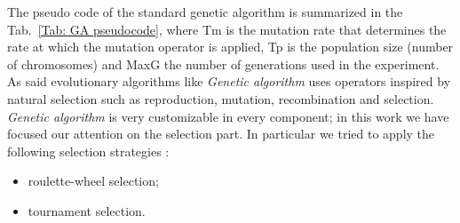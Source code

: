 The pseudo code of the standard genetic algorithm is summarized in the Tab.~\ref{Tab: GA pseudocode}, where Tm is the mutation rate that determines the rate at which the mutation operator is applied, Tp is the population size (number of
chromosomes) and MaxG the number of generations used in the experiment\cite{venti}.
As said evolutionary algorithms like \textit{Genetic algorithm} uses operators inspired by natural selection such as reproduction, mutation, recombination and selection.
\textit{Genetic algorithm} is very customizable in every component; in this work we have focused our attention on the selection part.
In particular we tried to apply the following selection strategies \cite{ventuno}:
\begin{itemize}
\item roulette-wheel selection;
\item tournament selection.
\end{itemize}
